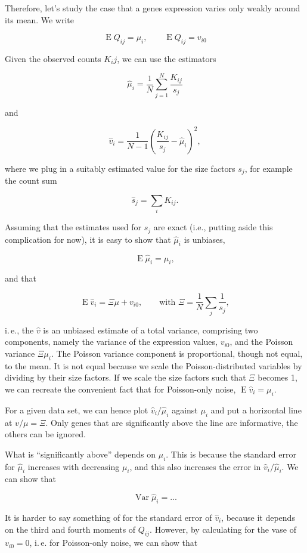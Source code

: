 \documentclass{article}
\begin{document}
Therefore, let's study the case that a genes expression varies only weakly around its mean. We write

\[ \operatorname{E} Q_{ij} = \mu_i, \qquad  \operatorname{E} Q_{ij} = v_{i0} \]

Given the observed counts $K_ij$, we can use the estimators

\[ \hat\mu_i = \frac{1}{N}\sum_{j=1}^N\frac{K_{ij}}{s_j} \]

and

\[ \hat v_i = \frac{1}{N-1} \left( \frac{K_{ij}}{s_j} - \hat\mu_i \right)^2,\]

where we plug in a suitably estimated value for the size factors $s_j$, for example the count sum

\[ \hat s_j = \sum_i K_{ij}.\]

Assuming that the estimates used for $s_j$ are exact (i.e., putting aside this complication for now), it is easy to show
that $\hat\mu_i$ is unbiases,

\[ \operatorname{E} \hat \mu_i = \mu_i, \]

and that 

\[ \operatorname{E} \hat v_i = \Xi \mu + v_{i0},\qquad\text{with } \Xi = \frac{1}{N}\sum_j\frac{1}{s_j}, \]

i.\,e., the $\hat v$ is an unbiased estimate of a total variance, comprising two components, namely the
variance of the expression values, $v_{i0}$, and the Poisson variance $\Xi\mu_i$. The Poisson variance
component is proportional, though not equal, to the mean. It is not equal because we scale the Poisson-distributed
variables by dividing by their size factors. If we scale the size factors such that $\Xi$ becomes 1, we can 
recreate the convenient fact that for Poisson-only noise, $\operatorname{E}\hat v_i = \mu_i$.

For a given data set, we can hence plot $\hat v_i/\hat\mu_i$ against $\mu_i$ and put a horizontal line at $v/\mu=\Xi$. Only genes
that are significantly above the line are informative, the others can be ignored.

What is ``significantly above'' depends on $\mu_i$. This is because the standard error for $\hat\mu_i$ increases with decreasing $\mu_i$, and this
also increases the error in $\hat v_i/\hat\mu_i$. We can show that

\[ \operatorname{Var}\hat\mu_i = ... \]

It is harder to say something of for the standard error of $\hat v_i$, because it depends on the third and fourth moments of $Q_{ij}$.
However, by calculating for the vase of $v_{i0} = 0$, i.\,e. for Poisson-only noise, we can show that
\end{document}

